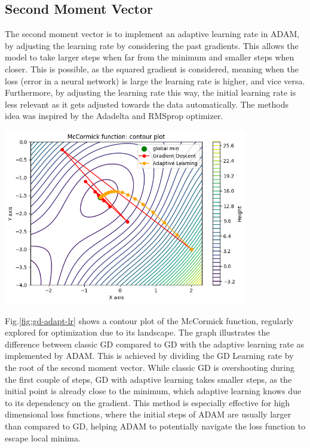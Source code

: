 \documentclass[oneside]{article}
\begin{document}
\subsection{Second Moment Vector}
The second moment vector is to implement an adaptive learning rate in ADAM, by adjusting the learning rate by considering the past gradients. This allows the model to take larger steps when far from the minimum and smaller steps when closer. This is possible, as the squared gradient is considered, meaning when the loss (error in a neural network) is large the learning rate is higher, and vice versa. Furthermore, by adjusting the learning rate this way, the initial learning rate is less relevant as it gets adjusted towards the data automatically. The methods idea was inspired by the Adadelta and RMSprop optimizer.\par
\begin{center}
    \includegraphics[width=0.8\textwidth]{report/figures/GD_rmsprop.png}
    \label{fig:gd-adapt-lr}
\end{center}\par
Fig.\ref{fig:gd-adapt-lr} shows a contour plot of the McCormick function, regularly explored for optimization due to its landscape. The graph illustrates the difference between classic GD compared to GD with the adaptive learning rate as implemented by ADAM. This is achieved by dividing the GD Learning rate by the root of the second moment vector. While classic GD is overshooting during the first couple of steps, GD with adaptive learning takes smaller steps, as the initial point is already close to the minimum, which adaptive learning knows due to its dependency on the gradient. This method is especially effective for high dimensional loss functions, where the initial steps of ADAM are usually larger than compared to GD, helping ADAM to potentially navigate the loss function to escape local minima.\par
\end{document}
